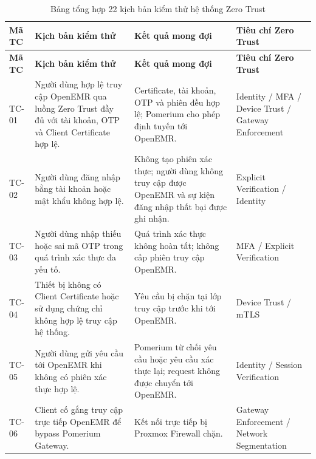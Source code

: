 \begin{longtable}{|
>{\centering\arraybackslash}p{1.1cm} |
>{\raggedright\arraybackslash}p{4.8cm} |
>{\raggedright\arraybackslash}p{4.8cm} |
>{\raggedright\arraybackslash}p{3.5cm} |
}

\caption{Bảng tổng hợp 22 kịch bản kiểm thử hệ thống Zero Trust}
\label{tab:testcases_summary} \\

\hline
\textbf{Mã TC} &
\textbf{Kịch bản kiểm thử} &
\textbf{Kết quả mong đợi} &
\textbf{Tiêu chí Zero Trust} \\
\hline
\endfirsthead

\hline
\textbf{Mã TC} &
\textbf{Kịch bản kiểm thử} &
\textbf{Kết quả mong đợi} &
\textbf{Tiêu chí Zero Trust} \\
\hline
\endhead

\hline
\endfoot

TC-01 &
Người dùng hợp lệ truy cập OpenEMR qua luồng Zero Trust đầy đủ với tài khoản, OTP và Client Certificate hợp lệ. &
Certificate, tài khoản, OTP và phiên đều hợp lệ; Pomerium cho phép định tuyến tới OpenEMR. &
Identity / MFA / Device Trust / Gateway Enforcement \\
\hline

TC-02 &
Người dùng đăng nhập bằng tài khoản hoặc mật khẩu không hợp lệ. &
Không tạo phiên xác thực; người dùng không truy cập được OpenEMR và sự kiện đăng nhập thất bại được ghi nhận. &
Explicit Verification / Identity \\
\hline

TC-03 &
Người dùng nhập thiếu hoặc sai mã OTP trong quá trình xác thực đa yếu tố. &
Quá trình xác thực không hoàn tất; không cấp phiên truy cập OpenEMR. &
MFA / Explicit Verification \\
\hline

TC-04 &
Thiết bị không có Client Certificate hoặc sử dụng chứng chỉ không hợp lệ truy cập hệ thống. &
Yêu cầu bị chặn tại lớp truy cập trước khi tới OpenEMR. &
Device Trust / mTLS \\
\hline

TC-05 &
Người dùng gửi yêu cầu tới OpenEMR khi không có phiên xác thực hợp lệ. &
Pomerium từ chối yêu cầu hoặc yêu cầu xác thực lại; request không được chuyển tới OpenEMR. &
Identity / Session Verification \\
\hline

TC-06 &
Client cố gắng truy cập trực tiếp OpenEMR để bypass Pomerium Gateway. &
Kết nối trực tiếp bị Proxmox Firewall chặn. &
Gateway Enforcement / Network Segmentation \\
\hline


\end{longtable}
